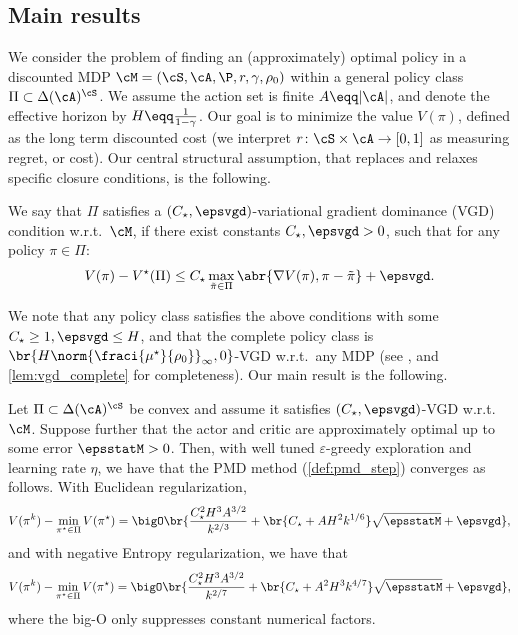 \subsection{Main results}
We consider the problem of finding an (approximately) optimal policy in a
discounted MDP $\cM = (\cS, \cA, \P, r, \gamma, \rho_0)$ within a general policy class $\Pi\subset \Delta(\cA)^{\cS}$.
We assume the action set is finite 
$A\eqq |\cA|$, and denote the effective horizon by $H\eqq \frac{1}{1-\gamma}$.
Our goal is to minimize the value $V(\pi)$, defined as the long term discounted cost (we interpret $r\colon\cS \times \cA \to [0,1]$ as measuring regret, or cost).
Our central structural assumption, that replaces and relaxes specific closure conditions, is the following.
\begin{definition}\label{def:vgd_mdp}
    We say that $\Pi$ satisfies a $(C_\star, \epsvgd)$-variational gradient dominance (VGD) condition w.r.t.~$\cM$, 
    if there exist constants $C_\star, \epsvgd>0$, such that for any policy $\pi\in \Pi$:
    \begin{align}\label{eq:M_vgd}
        V(\pi) - V^\star(\Pi) 
        \leq 
        C_\star \max_{\tilde \pi \in \Pi}\abr{\nabla V(\pi), \pi - \tilde \pi} + \epsvgd.
    \end{align}
\end{definition}
We note that any policy class satisfies the above conditions with some $C_\star \geq 1, \epsvgd \leq H$, and that the complete policy class is $\br{H\norm{\fraci{\mu^\star}{\rho_0}}_\infty, 0}$-VGD w.r.t.~any MDP (see \citealp{bhandari2024global,agarwal2021theory}, and \cref{lem:vgd_complete} for completeness).
Our main result is the following.
\begin{theorem*}[informal]
    Let $\Pi\subset \Delta(\cA)^\cS$ be convex and assume it satisfies $(C_\star, \epsvgd)$-VGD w.r.t.~$\cM$. 
    Suppose further that the actor and critic are approximately optimal up to some error $\epsstatM > 0$.
    Then, with well tuned $\varepsilon$-greedy exploration and learning rate $\eta$, we have that
    the PMD method (\cref{def:pmd_step}) converges as follows.
    With Euclidean regularization,
    \begin{align*}
            V(\pi^k) - \min_{\pi^\star\in \Pi}V(\pi^\star)=
            \bigO\br{
            \frac{C_\star^2 H^3 A^{3/2} }{k^{2/3}}
            + \br{C_\star + A H^2 k^{1/6}}\sqrt{\epsstatM}
            + \epsvgd},
        \end{align*}
    and with negative Entropy regularization, we have that 
        \begin{align*}
        V(\pi^k) - \min_{\pi^\star\in \Pi}V(\pi^\star)=
        \bigO\br{
                \frac{C_\star^2 H^3A^{3/2}  }{k^{2/7}}
                + \br{C_\star + A^2 H^3 k^{4/7}}\sqrt{\epsstatM} 
                + \epsvgd},
        \end{align*}
    where the big-O only suppresses constant numerical factors.
\end{theorem*}

